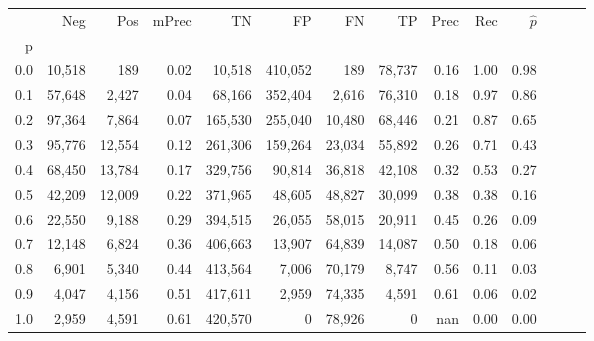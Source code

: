 \begin{tabular}{rrrrrrrrrrrrrr}
\toprule
{} &     Neg &     Pos & mPrec &       TN &       FP &      FN &      TP &  Prec &   Rec & $\hat{p}$ \\
p   &         &         &       &          &          &         &         &       &       &           \\
\midrule
0.0 &  10,518 &     189 &  0.02 &   10,518 &  410,052 &     189 &  78,737 &  0.16 &  1.00 &      0.98 \\
0.1 &  57,648 &   2,427 &  0.04 &   68,166 &  352,404 &   2,616 &  76,310 &  0.18 &  0.97 &      0.86 \\
0.2 &  97,364 &   7,864 &  0.07 &  165,530 &  255,040 &  10,480 &  68,446 &  0.21 &  0.87 &      0.65 \\
0.3 &  95,776 &  12,554 &  0.12 &  261,306 &  159,264 &  23,034 &  55,892 &  0.26 &  0.71 &      0.43 \\
0.4 &  68,450 &  13,784 &  0.17 &  329,756 &   90,814 &  36,818 &  42,108 &  0.32 &  0.53 &      0.27 \\
0.5 &  42,209 &  12,009 &  0.22 &  371,965 &   48,605 &  48,827 &  30,099 &  0.38 &  0.38 &      0.16 \\
0.6 &  22,550 &   9,188 &  0.29 &  394,515 &   26,055 &  58,015 &  20,911 &  0.45 &  0.26 &      0.09 \\
0.7 &  12,148 &   6,824 &  0.36 &  406,663 &   13,907 &  64,839 &  14,087 &  0.50 &  0.18 &      0.06 \\
0.8 &   6,901 &   5,340 &  0.44 &  413,564 &    7,006 &  70,179 &   8,747 &  0.56 &  0.11 &      0.03 \\
0.9 &   4,047 &   4,156 &  0.51 &  417,611 &    2,959 &  74,335 &   4,591 &  0.61 &  0.06 &      0.02 \\
1.0 &   2,959 &   4,591 &  0.61 &  420,570 &        0 &  78,926 &       0 &   nan &  0.00 &      0.00 \\
\bottomrule
\end{tabular}
